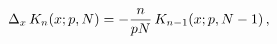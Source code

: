 \[\Delta_{x}\mathop{K_{n}\/}\nolimits\!\left(x;p,N\right)=-\frac{n}{pN}\mathop{K%
_{n-1}\/}\nolimits\!\left(x;p,N-1\right),\]